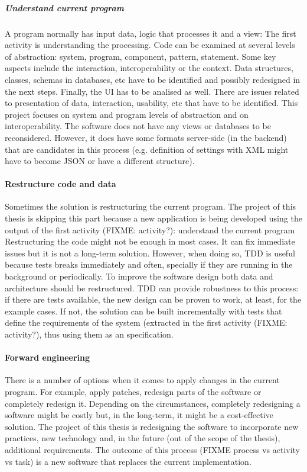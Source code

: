 \subparagraph{Understand current program}
A program normally has input data, logic that processes it and a view:
The first activity is understanding the processing.
Code can be examined at several levels of abstraction: system, program, component, pattern, statement.
Some key aspects include the interaction, interoperability or the context.
Data structures, classes, schemas in databases, etc have to be identified and possibly redesigned in the next steps.
Finally, the \ac{UI} has to be analised as well. 
There are issues related to presentation of data, interaction, usability, etc that have to be identified.
This project focuses on system and program levels of abstraction and on interoperability.
The software does not have any views or databases to be reconsidered.
However, it does have some formats server-side (in the backend) that are candidates in this process (e.g. definition of settings with XML might have to become JSON or have a different structure).

\paragraph{Restructure code and data}
Sometimes the solution is restructuring the current program.
The project of this thesis is skipping this part because a new application is being developed using the output of the first activity (FIXME: activity?): understand the current program
Restructuring the code might not be enough in most cases. 
It can fix immediate issues but it is not a long-term solution.
However, when doing so, \ac{TDD} is useful because tests breaks immediately and often, specially if they are running in the background or periodically.
To improve the software design both data and architecture should be restructured.
\ac{TDD} can provide robustness to this process: if there are tests available, the new design can be proven to work, at least, for the example cases. 
If not, the solution can be built incrementally with tests that define the requirements of the system (extracted in the first activity (FIXME: activity?), thus using them as an specification.

\paragraph{Forward engineering}
There is a number of options when it comes to apply changes in the current program. 
For example, apply patches, redesign parts of the software or completely redesign it.
Depending on the circumstances, completely redesigning a software might be costly but, in the long-term, it might be a cost-effective solution.
The project of this thesis is redesigning the software to incorporate new practices, new technology and, in the future (out of the scope of the thesis), additional requirements.
The outcome of this process (FIXME process vs activity vs task) is a new software that replaces the current implementation.

